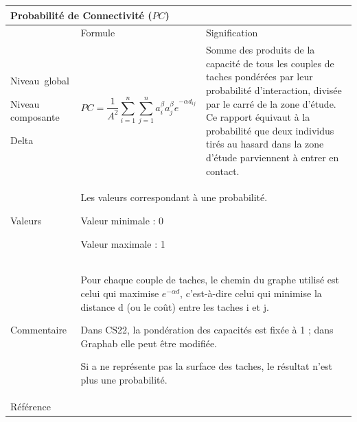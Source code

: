 \documentclass{article}
\begin{document}
\begin{table}[H]
\begin{tabular}{|m{3.24cm}|m{4.4810004cm}m{7.924cm}|}

\hline
\multicolumn{3}{|m{16.044998cm}|}{Probabilité de Connectivité ($PC$)}\\\hline
 &
\multicolumn{1}{m{4.4810004cm}|}{Formule} &
Signification\\\hline
Niveau~global

Niveau composante

Delta &
\multicolumn{1}{m{4.4810004cm}|}{\begin{equation*}
\mathit{PC}=\frac{1}{{A}^{2}}\sum _{i=1}^{n}{\sum _{j=1}^{n}{{a}_{i}^{\beta }}}{{a}_{j}^{\beta }e}^{-\alpha {d}_{\mathit{ij}}}
\end{equation*}
} &
Somme des produits de la capacité de tous les couples de taches pondérées par leur probabilité d’interaction, divisée par le carré de la zone d’étude. Ce rapport équivaut à la probabilité que deux individus tirés au hasard dans la zone d’étude parviennent à entrer en contact.

\\\hline
Valeurs &
\multicolumn{2}{m{12.6050005cm}|}{Les valeurs correspondant à une probabilité.

Valeur minimale : 0

Valeur maximale : 1
}\\\hline
Commentaire &
\multicolumn{2}{m{12.6050005cm}|}{Pour chaque couple de taches, le chemin du graphe utilisé est celui qui maximise  ${e}^{-\mathit{\alpha d}}$, c’est-à-dire celui qui minimise la distance d (ou le coût) entre les taches i et j.

Dans CS22, la pondération des capacités est fixée à 1 ; dans Graphab elle peut être modifiée.

Si a ne représente pas la surface des taches, le résultat n’est plus une probabilité.

}\\\hline
Référence &
\multicolumn{2}{m{12.6050005cm}|}{\cite{Saura2007}}\\\hline
\end{tabular}
\end{table}
\end{document}
